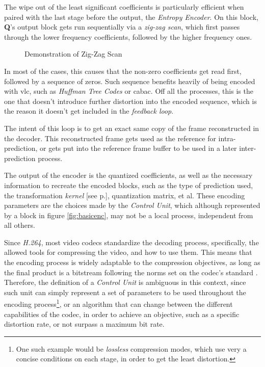 The wipe out of the least significant coefficients is particularly efficient when paired with the last stage before the output, the \emph{Entropy Encoder}. On this block, \textbf{Q}'s output block gets run sequentially via a \emph{zig-zag scan}, which first passes through the lower frequency coefficients, followed by the higher frequency ones. 

\begin{figure}[!htbp]
    \centering
    
    \caption{Demonstration of Zig-Zag Scan}
    \label{fig:zigzag}
\end{figure}

In most of the cases, this causes that the non-zero coefficients get read first, followed by a sequence of zeros. Such sequence benefits heavily of being encoded with \gls{vlc}, such as \emph{Huffman Tree Codes} or \Gls{cabac}. Off all the processes, this is the one that doesn't introduce further distortion into the encoded sequence, which is the reason it doesn't get included in the \emph{feedback loop}.

The intent of this loop is to get an exact same copy of the frame reconstructed in the decoder. This reconstructed frame gets used as the reference for intra-prediction, or gets put into the reference frame buffer to be used in a later inter-prediction process. 

The output of the encoder is the quantized coefficients, as well as the necessary information to recreate the encoded blocks, such as the type of prediction used, the transformation \emph{kernel} [see p.\pageref{par:kernel}], quantization matrix, et al. These encoding parameters are the choices made by the \emph{Control Unit}, which although represented by a block in figure \ref{fig:basicenc}, may not be a local process, independent from all others. 

Since \emph{H.264}, most video codecs standardize the decoding process, specifically, the allowed tools for compressing the video, and how to use them. This means that the encoding process is widely adaptable to the compression objectives, as long as the final product is a bitstream following the norms set on the codec's standard \cite{AV1BitstreamDecoding}. Therefore, the definition of a \emph{Control Unit} is ambiguous in this context, since such unit can simply represent a set of parameters to be used throughout the encoding process\footnote{One such example would be \emph{lossless} compression modes, which use very a concise conditions on each stage, in order to get the least distortion.}, or an algorithm that can change between the different capabilities of the codec, in order to achieve an objective, such as a specific distortion rate, or not surpass a maximum bit rate.

